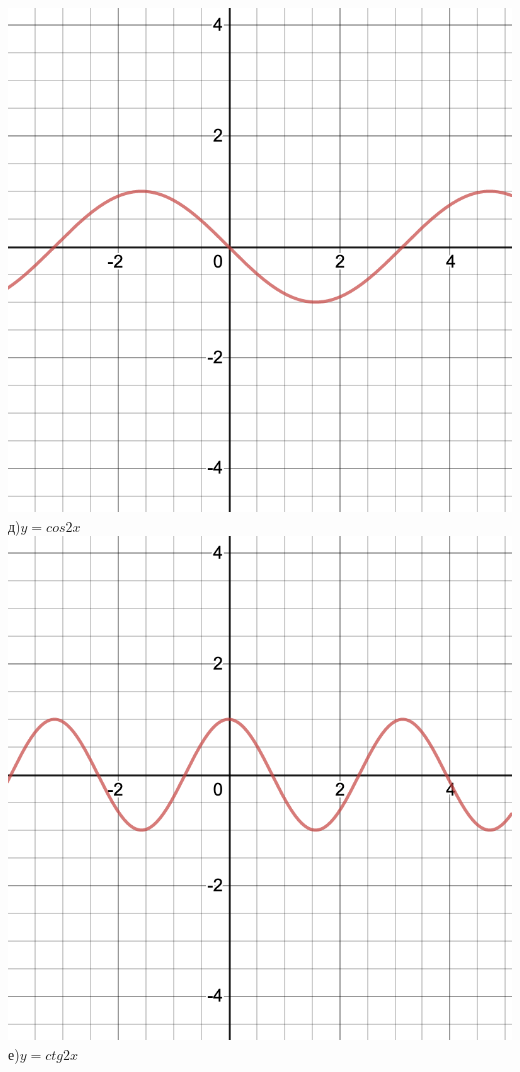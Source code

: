 \documentclass[a4paper]{article}
\begin{document}
    \includegraphics[scale=0.1]{d}\\
    д)$y=cos2x$
    \includegraphics[scale=0.1]{e}
    е)$y=ctg2x$
\end{document}
